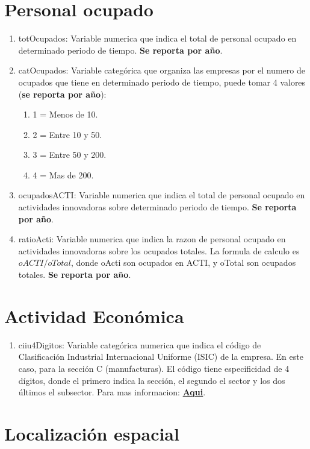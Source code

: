 \documentclass[12pt,a4paper]{article}
\begin{document}
\section{Personal ocupado}

\begin{enumerate}
	\item totOcupados: Variable numerica que indica el total de personal ocupado en determinado periodo de tiempo. \textbf{Se reporta por año}.
	\item catOcupados: Variable categórica que organiza las empresas por el numero de ocupados que tiene en determinado periodo de tiempo, puede tomar 4 valores (\textbf{se reporta por año}):
	\begin{enumerate}
		\item 1 = Menos de 10.
		\item 2 = Entre 10 y 50.
		\item 3 = Entre 50 y 200.
		\item 4 = Mas de 200.
	\end{enumerate}
	\item ocupadosACTI: Variable numerica que indica el total de personal ocupado en actividades innovadoras sobre determinado periodo de tiempo. \textbf{Se reporta por año}.
	\item ratioActi: Variable numerica que indica la razon de personal ocupado en actividades innovadoras sobre los ocupados totales. La formula de calculo es $ oACTI/ oTotal $, donde oActi son ocupados en ACTI, y oTotal son ocupados totales. \textbf{Se reporta por año}.
\end{enumerate}

\section{Actividad Económica}

\begin{enumerate}
	\item ciiu4Digitos: Variable categórica numerica que indica el código de Clasificación Industrial Internacional Uniforme (ISIC) de la empresa. En este caso, para la sección C (manufacturas). El código tiene especificidad de 4 dígitos, donde el primero indica la sección, el segundo el sector y los dos últimos el subsector. Para mas informacion:  \href{https://www.dane.gov.co/files/sen/nomenclatura/ciiu/CIIU_Rev_4_AC2020.pdf}{\textbf{Aqui}}.
\end{enumerate}

\section{Localización espacial}
\end{document}
